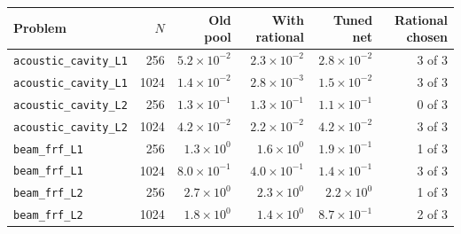 \begin{tabular}{lrrrrr}
\toprule
Problem & $N$ & Old pool & With rational & Tuned net & Rational chosen \\
\midrule
\texttt{acoustic\_cavity\_L1} & 256 & $5.2\times10^{-2}$ & $2.3\times10^{-2}$ & $2.8\times10^{-2}$ & 3 of 3 \\
\texttt{acoustic\_cavity\_L1} & 1024 & $1.4\times10^{-2}$ & $2.8\times10^{-3}$ & $1.5\times10^{-2}$ & 3 of 3 \\
\texttt{acoustic\_cavity\_L2} & 256 & $1.3\times10^{-1}$ & $1.3\times10^{-1}$ & $1.1\times10^{-1}$ & 0 of 3 \\
\texttt{acoustic\_cavity\_L2} & 1024 & $4.2\times10^{-2}$ & $2.2\times10^{-2}$ & $4.2\times10^{-2}$ & 3 of 3 \\
\texttt{beam\_frf\_L1} & 256 & $1.3\times10^{0}$ & $1.6\times10^{0}$ & $1.9\times10^{-1}$ & 1 of 3 \\
\texttt{beam\_frf\_L1} & 1024 & $8.0\times10^{-1}$ & $4.0\times10^{-1}$ & $1.4\times10^{-1}$ & 3 of 3 \\
\texttt{beam\_frf\_L2} & 256 & $2.7\times10^{0}$ & $2.3\times10^{0}$ & $2.2\times10^{0}$ & 1 of 3 \\
\texttt{beam\_frf\_L2} & 1024 & $1.8\times10^{0}$ & $1.4\times10^{0}$ & $8.7\times10^{-1}$ & 2 of 3 \\
\bottomrule
\end{tabular}
